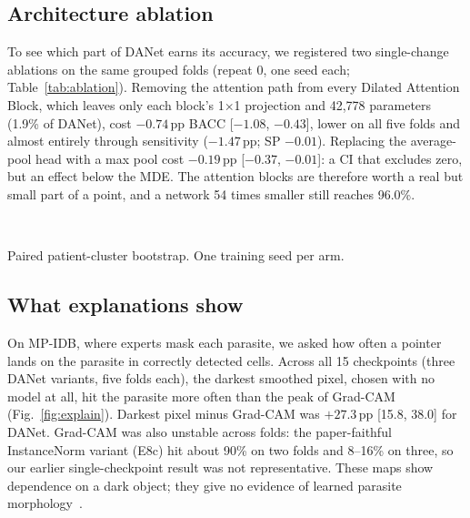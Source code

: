 \documentclass[conference]{IEEEtran}
\newcommand{\pp}{\,pp}
\begin{document}
\subsection{Architecture ablation}
\label{sec:ablation}
To see which part of DANet earns its accuracy, we registered two single-change ablations on the same grouped folds (repeat 0, one seed each; Table~\ref{tab:ablation}). Removing the attention path from every Dilated Attention Block, which leaves only each block's 1$\times$1 projection and 42{,}778 parameters (1.9\% of DANet), cost $-0.74$\pp{} BACC [$-1.08$, $-0.43$], lower on all five folds and almost entirely through sensitivity ($-1.47$\pp; SP $-0.01$). Replacing the average-pool head with a max pool cost $-0.19$\pp{} [$-0.37$, $-0.01$]: a CI that excludes zero, but an effect below the MDE. The attention blocks are therefore worth a real but small part of a point, and a network 54 times smaller still reaches 96.0\%.

\begin{table}[t]
\caption{Architecture ablation on NIH (grouped repeat 0, pooled out-of-fold)}
\label{tab:ablation}
\centering
\footnotesize
\setlength{\tabcolsep}{3pt}
\\[2pt]
\raggedright\scriptsize Paired patient-cluster bootstrap. One training seed per arm.
\end{table}

\subsection{What explanations show}
\label{sec:explain}
On MP-IDB, where experts mask each parasite, we asked how often a pointer lands on the parasite in correctly detected cells. Across all 15 checkpoints (three DANet variants, five folds each), the darkest smoothed pixel, chosen with no model at all, hit the parasite more often than the peak of Grad-CAM~\cite{selvaraju2017} (Fig.~\ref{fig:explain}). Darkest pixel minus Grad-CAM was $+27.3$\pp{} [15.8, 38.0] for DANet. Grad-CAM was also unstable across folds: the paper-faithful InstanceNorm variant (E8c) hit about 90\% on two folds and 8--16\% on three, so our earlier single-checkpoint result was not representative. These maps show dependence on a dark object; they give no evidence of learned parasite morphology~\cite{adebayo2018}.
\end{document}
